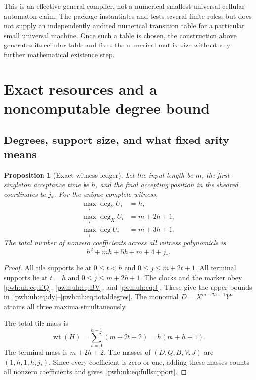 \documentclass[11pt,letterpaper]{article}
\numberwithin{equation}{section}
\newtheorem{proposition}[theorem]{Proposition}
\theoremstyle{definition}
\newcommand{\wt}{\operatorname{wt}}
\begin{document}
This is an effective general compiler, not a numerical smallest-universal
cellular-automaton claim. The package instantiates and tests several finite
rules, but does not supply an independently audited numerical transition
table for a particular small universal machine. Once such a table is
chosen, the construction above generates its cellular table and fixes the
numerical matrix size without any further mathematical existence step.

\section{Exact resources and a noncomputable degree bound}
\label{pwh:uh:sec:resources}

\subsection{Degrees, support size, and what fixed arity means}

\begin{proposition}[Exact witness ledger]
\label{pwh:uh:prop:ledger}
Let the input length be $m$, the first singleton acceptance time be $h$,
and the final accepting position in the sheared coordinates be $j_*$.
For the unique complete witness,
\begin{align}
 \max_i\deg_Y U_i&=h,\label{pwh:uh:eq:dy}\\
 \max_i\deg_X U_i&=m+2h+1,\label{pwh:uh:eq:dx}\\
 \max_i\deg U_i&=m+3h+1.\label{pwh:uh:eq:totaldegree}
\end{align}
The total number of nonzero coefficients across all witness polynomials is
\begin{equation}
  h^2+mh+5h+m+4+j_*.
  \label{pwh:uh:eq:fullsupport}
\end{equation}
\end{proposition}

\begin{proof}
All tile supports lie at $0\le t<h$ and
$0\le j\le m+2t+1$. All terminal supports lie at $t=h$ and
$0\le j\le m+2h+1$. The clocks and the marker obey
\eqref{pwh:uh:eq:DQ}, \eqref{pwh:uh:eq:BV}, and \eqref{pwh:uh:eq:J}. These give the upper
bounds in~\eqref{pwh:uh:eq:dy}--\eqref{pwh:uh:eq:totaldegree}. The monomial
$D=X^{m+2h+1}Y^h$ attains all three maxima simultaneously.

The total tile mass is
\[
 \wt(H)=\sum_{t=0}^{h-1}(m+2t+2)=h(m+h+1).
\]
The terminal mass is $m+2h+2$. The masses of $(D,Q,B,V,J)$ are
$(1,h,1,h,j_*)$. Since every coefficient is zero or one, adding these
masses counts all nonzero coefficients and gives~\eqref{pwh:uh:eq:fullsupport}.
\end{proof}
\end{document}
